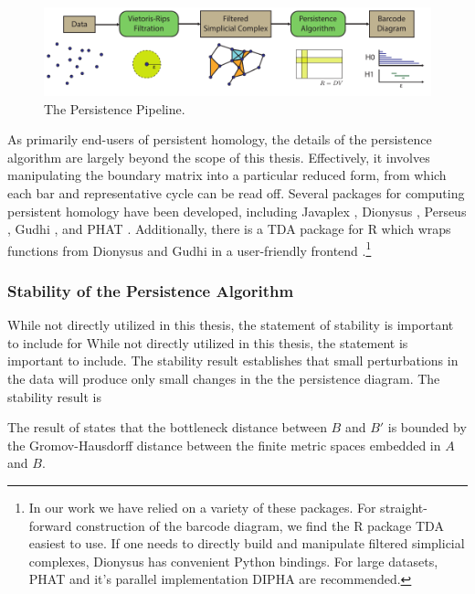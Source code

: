 \begin{figure}
\centering
\includegraphics[]{./fig/background/persistence_pipeline.pdf}
\caption[The Persistence Pipeline]{The Persistence Pipeline.}
\label{fig:bg:persistence_pipeline}
\end{figure}

As primarily end-users of persistent homology, the details of the persistence algorithm are largely beyond the scope of this thesis.
Effectively, it involves manipulating the boundary matrix into a particular reduced form, from which each bar and representative cycle can be read off.
Several packages for computing persistent homology have been developed, including Javaplex \cite{Tausz:2011}, Dionysus \cite{Morozov:2012}, Perseus \cite{Nanda:2013}, Gudhi \cite{maria:hal-01108461}, and PHAT \cite{Bauer:PHAT:2015}.
Additionally, there is a TDA package for R which wraps functions from Dionysus and Gudhi in a user-friendly frontend \cite{Fasy:TDA:2015}.\footnote{In our work we have relied on a variety of these packages. For straight-forward construction of the barcode diagram, we find the R package TDA easiest to use. If one needs to directly build and manipulate filtered simplicial complexes, Dionysus has convenient Python bindings. For large datasets, PHAT and it's parallel implementation DIPHA \cite{Bauer:DIPHA:2015,Bauer:2014gd} are recommended.}

\subsubsection{Stability of the Persistence Algorithm}
\label{bg:tda:ph:stability}

While not directly utilized in this thesis, the statement of stability is important to include for
While not directly utilized in this thesis, the statement is important to include.
The stability result establishes that small perturbations in the data will produce only small changes in the the persistence diagram.
The stability result is 


The result of \citet{Chazal:2009wc} states that the bottleneck distance between $B$ and $B'$ is bounded by the Gromov-Hausdorff distance between the finite metric spaces embedded in $A$ and $B$.

